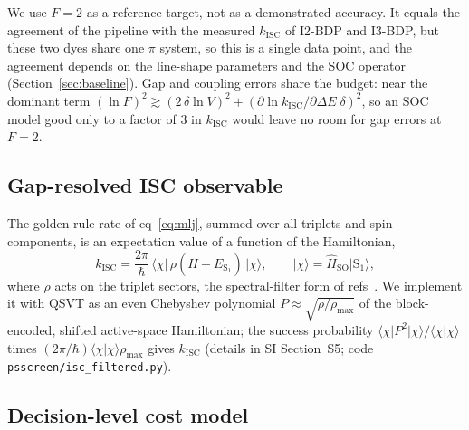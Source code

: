 \documentclass[journal=jctcce,manuscript=article]{achemso}
\newcommand{\kisc}{k_\mathrm{ISC}}
\newcommand{\Hso}{\hat H_\mathrm{SO}}
\begin{document}
We use $F=2$ as a reference target, not as a demonstrated accuracy. It equals the agreement of the pipeline with the
measured $\kisc$ of I2-BDP and I3-BDP, but these two dyes share one $\pi$ system, so this is a single data point, and
the agreement depends on the line-shape parameters and the SOC operator (Section~\ref{sec:baseline}). Gap and coupling
errors share the budget: near the dominant term $(\ln F)^2\gtrsim(2\,\delta\ln V)^2+(\partial\ln\kisc/\partial\Delta E\;\delta)^2$,
so an SOC model good only to a factor of 3 in $\kisc$ would leave no room for gap errors at $F=2$.

\subsection{Gap-resolved ISC observable}
\label{sec:filter-method}

The golden-rule rate of eq~\ref{eq:mlj}, summed over all triplets and spin components, is an
expectation value of a function of the Hamiltonian,
\begin{equation}
  \kisc = \frac{2\pi}{\hbar}\,\langle\chi\rvert\,\rho(\hat H - E_{\mathrm{S}_1})\,\lvert\chi\rangle,\qquad
  \lvert\chi\rangle = \Hso\lvert\mathrm{S}_1\rangle ,
  \label{eq:filter}
\end{equation}
where $\rho$ acts on the triplet sectors, the spectral-filter form of refs~.
We implement it with QSVT as an even Chebyshev polynomial $P\approx\sqrt{\rho/\rho_\mathrm{max}}$ of the
block-encoded, shifted active-space Hamiltonian; the success probability
$\langle\chi\rvert P^2\lvert\chi\rangle/\langle\chi\vert\chi\rangle$ times
$(2\pi/\hbar)\langle\chi\vert\chi\rangle\rho_\mathrm{max}$ gives $\kisc$ (details in SI Section~S5; code
\texttt{psscreen/isc\_filtered.py}).

\subsection{Decision-level cost model}
\label{sec:decision-method}
\end{document}
